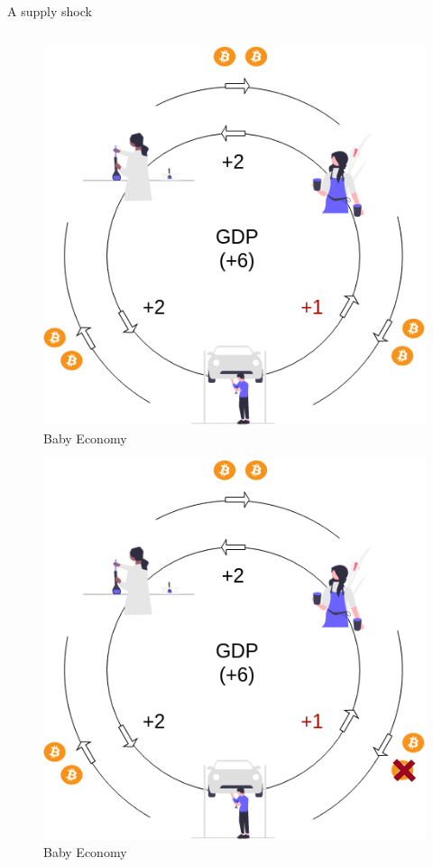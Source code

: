 \begin{frame}{A supply shock}
\begin{columns}[T]
\begin{column}{0.48\textwidth}
\begin{overprint}
\begin{figure}
\centering
\includegraphics[width=1\textwidth,height=\textheight]{assets/circular_supply_1.png}
\caption{Baby Economy}
\end{figure}


\begin{figure}
\centering
\includegraphics[width=1\textwidth,height=\textheight]{assets/circular_supply_2.png}
\caption{Baby Economy}
\end{figure}


\end{overprint}
\end{column}
\end{columns}
\end{frame}
